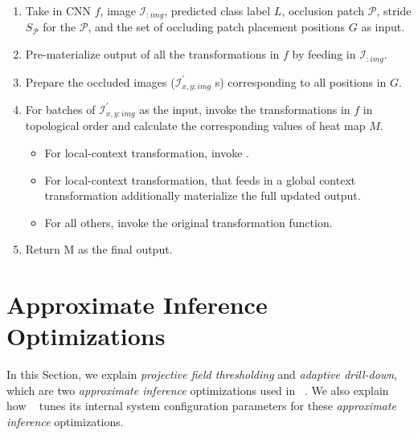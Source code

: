 \begin{enumerate}
	\item Take in CNN $f$, image $\mathcal{I}_{:img}$, predicted class label $L$, occlusion patch $\mathcal{P}$, stride $S_{\mathcal{P}}$ for the $\mathcal{P}$, and the set of occluding patch placement positions $G$ as input.
	\item Pre-materialize output of all the transformations in $f$ by feeding in $\mathcal{I}_{:img}$.
	\item Prepare the occluded images ($\mathcal{I}^{'}_{x,y:img}$ s) corresponding to all positions in $G$.
	\item For batches of $\mathcal{I}^{'}_{x,y:img}$ as the input, invoke the transformations in $f$ in topological order and calculate the corresponding values of heat map $M$.
	\begin{itemize}
		\item For local-context transformation, invoke .
		\item For local-context transformation, that feeds in a global context transformation additionally materialize the full updated output.
		\item For all others, invoke the original transformation function.
	\end{itemize}
	\item Return M as the final output.
\end{enumerate}


\section{Approximate Inference Optimizations}\label{sec:approx}
In this Section, we explain \textit{projective field thresholding} and \textit{adaptive drill-down}, which are two \textit{approximate inference} optimizations used in ~\system.
We also explain how \system~ tunes its internal system configuration parameters for these \textit{approximate inference} optimizations.


